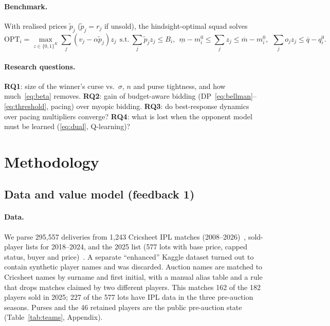 \documentclass{article}
\newcommand{\1}{\mathbb{1}}
\begin{document}
\paragraph{Benchmark.} With realised prices $\tilde p_j$ ($\tilde p_j=r_j$ if unsold), the hindsight-optimal squad solves
\begin{equation}
 \mathrm{OPT}_i=\max_{z\in\{0,1\}^K}\textstyle\sum_j(v_j-\alpha\tilde p_j)z_j\ \ \text{s.t.}\ \sum_j\tilde p_jz_j\le B_i,\ \ \underline m-m_i^0\le\sum_jz_j\le\overline m-m_i^0,\ \ \sum_jo_jz_j\le\overline q-q_i^0.\label{eq:ilp}
\end{equation}
\paragraph{Research questions.}\label{sec:rq}
\textbf{RQ1}: size of the winner's curse vs.\ $\sigma$, $n$ and purse tightness, and how much~\eqref{eq:beta} removes. \textbf{RQ2}: gain of budget-aware bidding (DP~\eqref{eq:bellman}--\eqref{eq:threshold}, pacing) over myopic bidding. \textbf{RQ3}: do best-response dynamics over pacing multipliers converge? \textbf{RQ4}: what is lost when the opponent model must be learned (\eqref{eq:dual}, Q-learning)?

\section{Methodology}
\label{sec:method}

\subsection{Data and value model (feedback 1)}\label{sec:m-data}
\paragraph{Data.} We parse 295{,}557 deliveries from 1{,}243 Cricsheet IPL matches (2008--2026)~\citep{cricsheet}, sold-player lists for 2018--2024, and the 2025 list (577 lots with base price, capped status, buyer and price)~\citep{kaggle_auction}. A separate ``enhanced'' Kaggle dataset turned out to contain synthetic player names and was discarded. Auction names are matched to Cricsheet names by surname and first initial, with a manual alias table and a rule that drops matches claimed by two different players. This matches 162 of the 182 players sold in 2025; 227 of the 577 lots have IPL data in the three pre-auction seasons. Purses and the 46 retained players are the public pre-auction state (Table~\ref{tab:teams}, Appendix).
\end{document}
